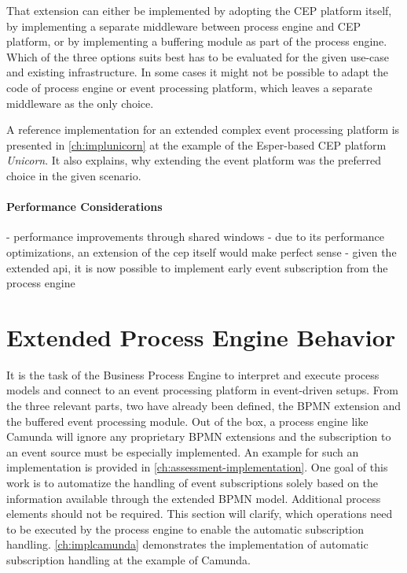 That extension can either be implemented by adopting the CEP platform itself, by implementing a separate middleware between process engine and CEP platform, or by implementing a buffering module as part of the process engine.
Which of the three options suits best has to be evaluated for the given use-case and existing infrastructure. In some cases it might not be possible to adapt the code of process engine or event processing platform, which leaves a separate middleware as the only choice.

A reference implementation for an extended complex event processing platform is presented in \autoref{ch:implunicorn} at the example of the Esper-based CEP platform \textit{Unicorn}. It also explains, why extending the event platform was the preferred choice in the given scenario.

\paragraph{Performance Considerations}

- performance improvements through shared windows
- due to its performance optimizations, an extension of the cep itself would make perfect sense
- given the extended api, it is now possible to implement early event subscription from the process engine


\section{Extended Process Engine Behavior}\label{ch:extendedprocessengine}
It is the task of the Business Process Engine to interpret and execute process models and connect to an event processing platform in event-driven setups.
From the three relevant parts, two have already been defined, the BPMN extension and the buffered event processing module.
Out of the box, a process engine like Camunda will ignore any proprietary BPMN extensions and the subscription to an event source must be especially implemented. An example for such an implementation is provided in \autoref{ch:assessment-implementation}.
One goal of this work is to automatize the handling of event subscriptions solely based on the information available through the extended BPMN model. Additional process elements should not be required.
This section will clarify, which operations need to be executed by the process engine to enable the automatic subscription handling.
\autoref{ch:implcamunda} demonstrates the implementation of automatic subscription handling at the example of Camunda.


